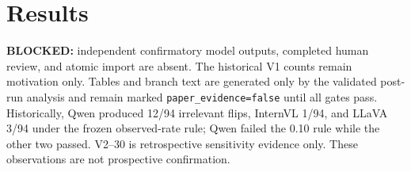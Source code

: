 \section{Results}
\textbf{BLOCKED:} independent confirmatory model outputs, completed human review, and atomic import are
absent. The historical V1 counts remain motivation only. Tables and branch text are generated only by
the validated post-run analysis and remain marked \texttt{paper\_evidence=false} until all gates pass.
Historically, Qwen produced 12/94 irrelevant flips, InternVL 1/94, and LLaVA 3/94 under the frozen
observed-rate rule; Qwen failed the 0.10 rule while the other two passed. V2--30 is retrospective
sensitivity evidence only. These observations are not prospective confirmation.
